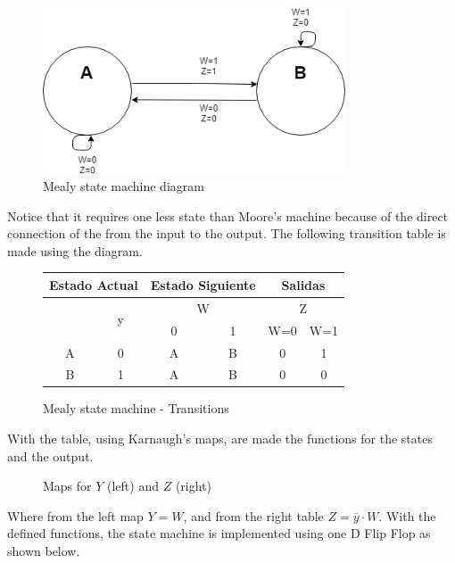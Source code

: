 \begin{figure}[H]
    \begin{centering}
    \includegraphics[width=0.8\textwidth]{Graficos3/3b_fsm.png}
    \par\end{centering}
    \caption{Mealy state machine diagram}
\end{figure}

Notice that it requires one less state than Moore's
machine because of the direct connection of the 
from the input to the output. The following 
transition table is made using the diagram.

\begin{figure}[H]
    \begin{center}
        \begin{tabular}{|c|c|c|c||c|c|}
            \hline 
            \multicolumn{2}{|c|}{Estado Actual} & \multicolumn{2}{c||}{Estado Siguiente} & \multicolumn{2}{c|}{Salidas}\tabularnewline
            \hline 
            \hline 
            \multirow{2}{*}{} & \multirow{2}{*}{y} & \multicolumn{2}{c||}{W} & \multicolumn{2}{c|}{Z}\tabularnewline
            \cline{3-6} 
             &  & \multicolumn{1}{c|}{0} & \multicolumn{1}{c||}{1} & W=0 & W=1\tabularnewline
            \hline 
            A & 0 & A & B & 0 & 1\tabularnewline
            \hline 
            B & 1 & A & B & 0 & 0\tabularnewline
            \hline 
            \end{tabular}
        \caption{Mealy state machine - Transitions}
    \end{center}
\end{figure}

With the table, using Karnaugh's maps, are made 
the functions for the states and the output.

\begin{figure}[H]
    \begin{center}
     \begin{Karnaughquatre}
     \end{Karnaughquatre}
     \begin{Karnaughquatre}
    \end{Karnaughquatre}
     \caption{Maps for $Y$ (left) and $Z$ (right)}
    \end{center}
\end{figure}
Where from the left map $Y = W$, and from the right
table $Z = \overline{y} \cdot W$.
With the defined functions, the state machine is 
implemented using one D Flip Flop as shown below.

